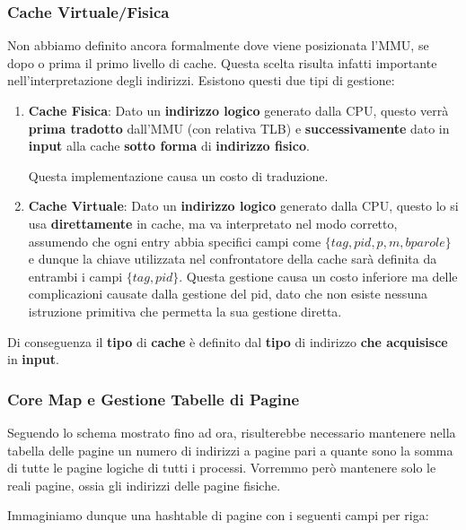 \documentclass{article}
\begin{document}
\subsubsection{Cache Virtuale/Fisica}

Non abbiamo definito ancora formalmente dove viene posizionata l'MMU, se dopo o prima il primo livello di cache. Questa scelta risulta infatti importante
nell'interpretazione degli indirizzi. Esistono questi due tipi di gestione:

\begin{enumerate}
    \item \textbf{Cache Fisica}: Dato un \textbf{indirizzo logico} generato dalla CPU, questo verrà \textbf{prima tradotto} dall'MMU (con relativa TLB) e \textbf{successivamente} dato in \textbf{input} alla cache \textbf{sotto forma} di \textbf{indirizzo fisico}.
    
    Questa implementazione causa un costo di traduzione.
    \item \textbf{Cache Virtuale}: Dato un \textbf{indirizzo logico} generato dalla CPU, questo lo si usa \textbf{direttamente} in cache, ma va interpretato nel modo corretto, assumendo che ogni entry abbia specifici campi come $\{tag, pid, p, m, b parole\}$ e dunque la chiave utilizzata nel confrontatore della cache sarà definita da entrambi i campi $\{tag, pid\}$. Questa gestione causa un costo inferiore ma delle complicazioni causate dalla gestione del pid, dato che non esiste nessuna istruzione
    primitiva che permetta la sua gestione diretta.
\end{enumerate}

Di conseguenza il \textbf{tipo} di \textbf{cache} è definito dal \textbf{tipo} di indirizzo \textbf{che acquisisce} in \textbf{input}.

\newpage
\subsubsection{Core Map e Gestione Tabelle di Pagine}

Seguendo lo schema mostrato fino ad ora, risulterebbe necessario mantenere nella tabella delle pagine un numero di indirizzi a pagine pari a quante sono la somma di tutte le pagine logiche di tutti i processi. Vorremmo
però mantenere solo le reali pagine, ossia gli indirizzi delle pagine fisiche. 



Immaginiamo dunque una hashtable di pagine con i seguenti campi per riga:
\end{document}
